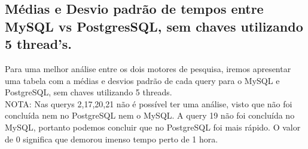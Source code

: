 \documentclass{article}
\begin{document}
  \clearpage

  \subsection{Médias e Desvio padrão de tempos entre MySQL vs PostgresSQL, sem chaves utilizando 5 thread's.}

  \texttt{}\par Para uma melhor análise entre os dois motores de pesquisa, iremos apresentar uma tabela com a médias e desvios padrão de cada query para o MySQL e PostgreSQL, sem chaves utilizando 5 threads. \\
NOTA: Nas querys 2,17,20,21 não é possível ter uma análise, visto que não foi concluída nem no PostgreSQL nem o MySQL. A query 19 não foi concluída no MySQL, portanto podemos concluir que no PostgreSQL foi mais rápido. O valor de 0 significa que demorou imenso tempo perto de 1 hora.
\end{document}
